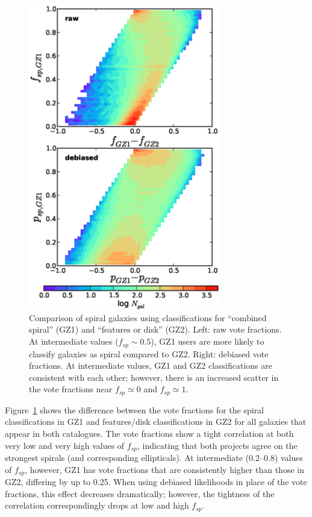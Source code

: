 \documentclass[useAMS,usenatbib]{mn2e}
\begin{document}
\begin{figure}
\includegraphics[angle=0,width=3.3in]{figures/gz1_gz2_trumpet.eps}
\caption{Comparison of spiral galaxies using classifications for ``combined spiral'' (GZ1) and ``features or disk'' (GZ2). Left: raw vote fractions. At intermediate values ($f_{sp}\sim0.5$), GZ1 users are more likely to classify galaxies as spiral compared to GZ2. Right: debiased vote fractions. At intermediate values, GZ1 and GZ2 classifications are consistent with each other; however, there is an increased scatter in the vote fractions near $f_{sp}\simeq0$ and $f_{sp}\simeq1$. 
\label{fig-trumpet}}
\end{figure}

Figure~\ref{fig-trumpet} shows the difference between the vote fractions for the spiral classifications in GZ1 and features/disk classifications in GZ2 for all galaxies that appear in both catalogues. The vote fractions show a tight correlation at both very low and very high values of $f_{sp}$, indicating that both projects agree on the strongest spirals (and corresponding ellipticals). At intermediate (0.2--0.8) values of $f_{sp}$, however, GZ1 has vote fractions that are consistently higher than those in GZ2, differing by up to 0.25. When using debiased likelihoods in place of the vote fractions, this effect decreases dramatically; however, the tightness of the correlation correspondingly drops at low and high $f_{sp}$. 
\end{document}
